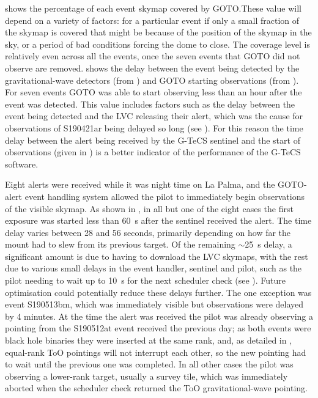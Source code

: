 \begin{colsection}
\clearpage

 shows the percentage of each event skymap covered by GOTO.\@ These value will depend on a variety of factors: for a particular event if only a small fraction of the skymap is covered that might be because of the position of the skymap in the sky, or a period of bad conditions forcing the dome to close. The coverage level is relatively even across all the events, once the seven events that GOTO did not observe are removed.  shows the delay between the event being detected by the gravitational-wave detectors (from ) and GOTO starting observations (from ). For seven events GOTO was able to start observing less than an hour after the event was detected. This value includes factors such as the delay between the event being detected and the LVC releasing their alert, which was the cause for observations of S190421ar being delayed so long (see ). For this reason the time delay between the alert being received by the G-TeCS sentinel and the start of observations (given in ) is a better indicator of the performance of the G-TeCS software.

Eight alerts were received while it was night time on La Palma, and the GOTO-alert event handling system allowed the pilot to immediately begin observations of the visible skymap. As shown in , in all but one of the eight cases the first exposure was started less than \SI{60}{\second} after the sentinel received the alert. The time delay varies between 28 and 56 seconds, primarily depending on how far the mount had to slew from its previous target. Of the remaining $\sim$\SI{25}{\second} delay, a significant amount is due to having to download the LVC skymaps, with the rest due to various small delays in the event handler, sentinel and pilot, such as the pilot needing to wait up to \SI{10}{\second} for the next scheduler check (see ). Future optimisation could potentially reduce these delays further. The one exception was event S190513bm, which was immediately visible but observations were delayed by 4 minutes. At the time the alert was received the pilot was already observing a pointing from the S190512at event received the previous day; as both events were black hole binaries they were inserted at the same rank, and, as detailed in , equal-rank ToO pointings will not interrupt each other, so the new pointing had to wait until the previous one was completed. In all other cases the pilot was observing a lower-rank target, usually a survey tile, which was immediately aborted when the scheduler check returned the ToO gravitational-wave pointing.


\end{colsection}
